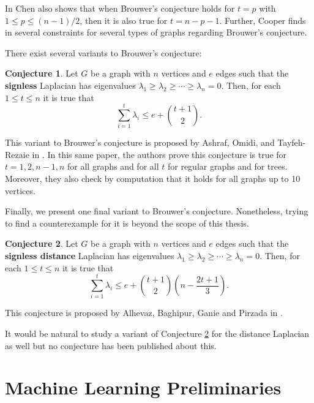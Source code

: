 \documentclass[11pt]{article}
\theoremstyle{definition}
\newtheorem{conj}{Conjecture}
\begin{document}
In \cite{Chen:2019} Chen also shows that when Brouwer's conjecture holds for $t=p$ with $1 \leq p \leq (n-1)/2$, then it is also true for $t=n-p-1$. Further, Cooper finds in \cite{Cooper:2020} several constraints for several types of graphs regarding Brouwer's conjecture.

There exist several variants to Brouwer's conjecture:

\begin{conj}\label{signless}
Let $G$ be a graph with $n$ vertices and $e$ edges such that the \textbf{signless} Laplacian has eigenvalues $\lambda_1 \geq \lambda_2 \geq \cdots \geq \lambda_n = 0$. Then, for each $1 \leq t \leq n$ it is true that 
\begin{equation*}
    \sum_{i=1}^{t} \lambda_i \leq e + {t+1 \choose 2}.
\end{equation*}
\end{conj}

This variant to Brouwer's conjecture is proposed by Ashraf, Omidi, and Tayfeh-Rezaie in \cite{Ashraf:Omidi:Tayfeh-Rezaie}. In this same paper, the authors prove this conjecture is true for $t=1,2,n-1,n$ for all graphs and for all $t$ for regular graphs and for trees. Moreover, they also check by computation that it holds for all graphs up to 10 vertices.

Finally, we present one final variant to Brouwer's conjecture. Nonetheless, trying to find a counterexample for it is beyond the scope of this thesis.

\begin{conj}\label{signless distance}
Let $G$ be a graph with $n$ vertices and $e$ edges such that the \textbf{signless distance} Laplacian has eigenvalues $\lambda_1 \geq \lambda_2 \geq \cdots \geq \lambda_n = 0$. Then, for each $1 \leq t \leq n$ it is true that 
\begin{equation*}
    \sum_{i=1}^{t} \lambda_i \leq e + {t+1 \choose 2}(n-\frac{2t+1}{3}).
\end{equation*}
\end{conj}

This conjecture is proposed by Alhevaz, Baghipur, Ganie and Pirzada in \cite{Alhevaz:Baghipur:Ganie:Pirzada}.

It would be natural to study a variant of Conjecture \ref{signless distance} for the distance Laplacian as well but no conjecture has been published about this.

\newpage

\section{Machine Learning Preliminaries} \label{machine learning}
\end{document}
